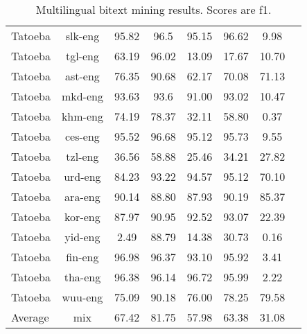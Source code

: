 \documentclass[11pt]{article}
\begin{document}
\begin{table*}[t!]
{\begin{tabular}{lc|cccccc}
Tatoeba & slk-eng & 95.82 & 96.5 & 95.15 & 96.62 & 9.98 \\
Tatoeba & tgl-eng & 63.19 & 96.02 & 13.09 & 17.67 & 10.70 \\
Tatoeba & ast-eng & 76.35 & 90.68 & 62.17 & 70.08 & 71.13 \\
Tatoeba & mkd-eng & 93.63 & 93.6 & 91.00 & 93.02 & 10.47 \\
Tatoeba & khm-eng & 74.19 & 78.37 & 32.11 & 58.80 & 0.37 \\
Tatoeba & ces-eng & 95.52 & 96.68 & 95.12 & 95.73 & 9.55 \\
Tatoeba & tzl-eng & 36.56 & 58.88 & 25.46 & 34.21 & 27.82 \\
Tatoeba & urd-eng & 84.23 & 93.22 & 94.57 & 95.12 & 70.10 \\
Tatoeba & ara-eng & 90.14 & 88.80 & 87.93 & 90.19 & 85.37 \\
Tatoeba & kor-eng & 87.97 & 90.95 & 92.52 & 93.07 & 22.39 \\
Tatoeba & yid-eng & 2.49 & 88.79 & 14.38 & 30.73 & 0.16 \\
Tatoeba & fin-eng & 96.98 & 96.37 & 93.10 & 95.92 & 3.41 \\
Tatoeba & tha-eng & 96.38 & 96.14 & 96.72 & 95.99 & 2.22 \\
Tatoeba & wuu-eng & 75.09 & 90.18 & 76.00 & 78.25 & 79.58 \\
\midrule
\midrule
Average & mix & 67.42 & 81.75 & 57.98 & 63.38 & 31.08 \\
\hline
    \bottomrule
    \end{tabular}}
    \caption{Multilingual bitext mining results. Scores are f1.}
    \label{tab:addresultsmult}
\end{table*}
\end{document}
